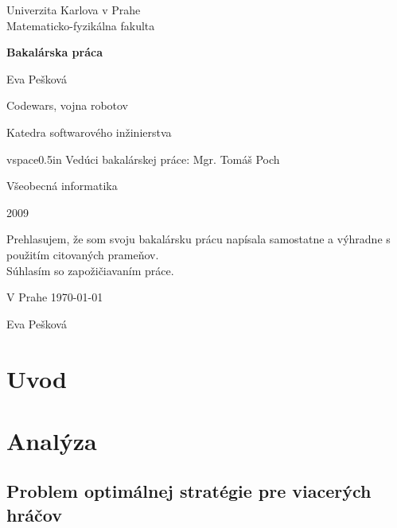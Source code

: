 \documentclass[12pt,a4paper,notitlepage]{report}
\begin{document}
\begin{titlepage}
\begin{center}
\vspace{1.5in}
{\rm Univerzita Karlova v Prahe\\
    Matematicko-fyzikálna fakulta}
\par
\vspace{0.7in}
{\huge \bf Bakalárska práca}
\par
\vspace{0.5in}
{Eva Pešková}
\par
\vspace{0.5in}
Codewars, vojna robotov
\par
\vfill
Katedra softwarového inžinierstva
\par
vspace{0.5in}
Vedúci bakalárskej práce: Mgr. Tomáš Poch
\par
\vspace{0.5in}
Všeobecná informatika
\par
\vspace{0.5in}
2009
\end{center}
\end{titlepage}
\vfill
Prehlasujem, že som svoju bakalársku prácu napísala samostatne a výhradne s použitím citovaných prameňov.\\
Súhlasím so zapožičiavaním práce.\\
\par
V Prahe \today
\begin{flushright}
Eva Pešková
\end{flushright}

\newtheorem{definicia}{Značenie}

\tableofcontents
\chapter{Uvod}%

\chapter{Analýza}
%


\section{Problem optimálnej stratégie pre viacerých hráčov}
\end{document}
